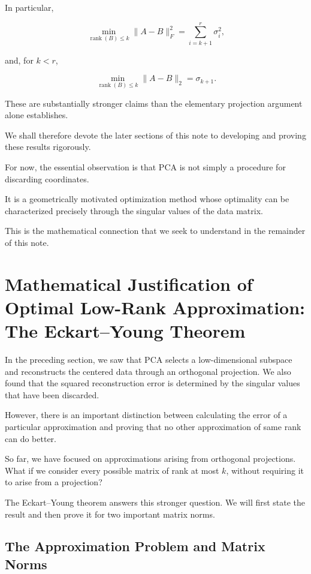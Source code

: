 \documentclass[11pt]{article}
\begin{document}
In particular,

\[
\boxed{
\min_{\operatorname{rank}(B)\leq k}
\|A-B\|_F^2
=
\sum_{i=k+1}^{r}\sigma_i^2,
}
\]

and, for $k<r$,

\[
\boxed{
\min_{\operatorname{rank}(B)\leq k}
\|A-B\|_2
=
\sigma_{k+1}.
}
\]

These are substantially
stronger claims than
the elementary projection
argument alone establishes.

We shall therefore devote
the later sections of this
note to developing and
proving these results
rigorously.

For now, the essential
observation is that PCA
is not simply a procedure
for discarding coordinates.

It is a geometrically
motivated optimization
method whose optimality
can be characterized
precisely through the
singular values of the
data matrix.

This is the mathematical
connection that we seek
to understand in the
remainder of this note.


\section{Mathematical Justification of Optimal
Low-Rank Approximation: The Eckart--Young Theorem}

In the preceding section, we saw that PCA
selects a low-dimensional subspace and
reconstructs the centered data through
an orthogonal projection. We also found
that the squared reconstruction error is
determined by the singular values that
have been discarded.

However, there is an important distinction
between calculating the error of a particular
approximation and proving that no other
approximation of same rank can do better.

So far, we have focused on approximations
arising from orthogonal projections. What
if we consider every possible matrix of
rank at most $k$, without requiring it
to arise from a projection?

The Eckart--Young theorem answers this
stronger question. We will first state
the result and then prove it for two
important matrix norms.

\subsection{The Approximation Problem and Matrix Norms}
\end{document}
